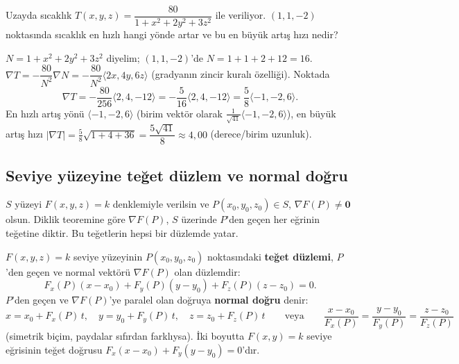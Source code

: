 \begin{soru}
Uzayda sıcaklık $T(x,y,z)=\dfrac{80}{1+x^2+2y^2+3z^2}$ ile veriliyor. $(1,1,-2)$ noktasında sıcaklık en hızlı hangi yönde
artar ve bu en büyük artış hızı nedir?
\end{soru}
\begin{cevap}
$N=1+x^2+2y^2+3z^2$ diyelim; $(1,1,-2)$'de $N=1+1+2+12=16$. $\nabla T=-\dfrac{80}{N^2}\nabla N=-\dfrac{80}{N^2}\langle2x,4y,6z\rangle$
(gradyanın zincir kuralı özelliği). Noktada
\[
\nabla T=-\frac{80}{256}\langle2,4,-12\rangle=-\frac{5}{16}\langle2,4,-12\rangle=\frac58\langle-1,-2,6\rangle .
\]
En hızlı artış yönü $\langle-1,-2,6\rangle$ (birim vektör olarak $\frac{1}{\sqrt{41}}\langle-1,-2,6\rangle$), en büyük
artış hızı $|\nabla T|=\frac58\sqrt{1+4+36}=\dfrac{5\sqrt{41}}{8}\approx4{,}00$ (derece/birim uzunluk).
\end{cevap}

\subsection{Seviye yüzeyine teğet düzlem ve normal doğru}

$S$ yüzeyi $F(x,y,z)=k$ denklemiyle verilsin ve $P(x_0,y_0,z_0)\in S$, $\nabla F(P)\ne\mathbf 0$ olsun. Diklik teoremine
göre $\nabla F(P)$, $S$ üzerinde $P$'den geçen her eğrinin teğetine diktir. Bu teğetlerin hepsi bir düzlemde yatar.

\begin{tanim}
$F(x,y,z)=k$ seviye yüzeyinin $P(x_0,y_0,z_0)$ noktasındaki \textbf{teğet düzlemi}, $P$'den geçen ve normal vektörü
$\nabla F(P)$ olan düzlemdir:
\[
F_x(P)(x-x_0)+F_y(P)(y-y_0)+F_z(P)(z-z_0)=0 .
\]
$P$'den geçen ve $\nabla F(P)$'ye paralel olan doğruya \textbf{normal doğru} denir:
\[
x=x_0+F_x(P)\,t,\quad y=y_0+F_y(P)\,t,\quad z=z_0+F_z(P)\,t
\qquad\text{veya}\qquad
\frac{x-x_0}{F_x(P)}=\frac{y-y_0}{F_y(P)}=\frac{z-z_0}{F_z(P)}
\]
(simetrik biçim, paydalar sıfırdan farklıysa). İki boyutta $F(x,y)=k$ seviye eğrisinin teğet doğrusu
$F_x(x-x_0)+F_y(y-y_0)=0$'dır.
\end{tanim}


